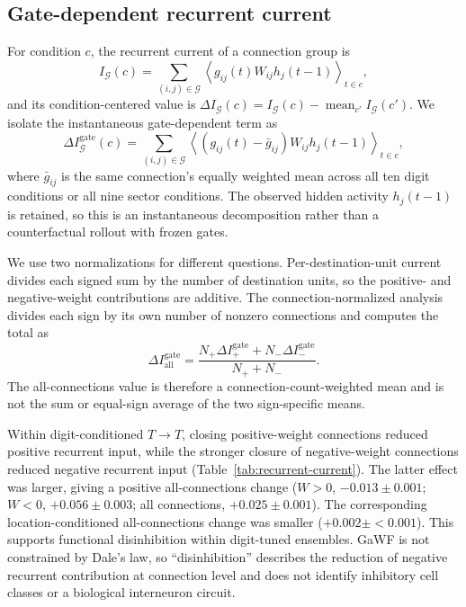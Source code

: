 \subsection{Gate-dependent recurrent current}

For condition \(c\), the recurrent current of a connection group is
\[
I_{\mathcal G}(c)=\sum_{(i,j)\in\mathcal G}\left\langle g_{ij}(t)W_{ij}h_j(t-1)\right\rangle_{t\in c},
\]
and its condition-centered value is \(\Delta I_{\mathcal G}(c)=I_{\mathcal G}(c)-\operatorname{mean}_{c'}I_{\mathcal G}(c')\). We isolate the instantaneous gate-dependent term as
\[
\Delta I^{\mathrm{gate}}_{\mathcal G}(c)=\sum_{(i,j)\in\mathcal G}\left\langle\left(g_{ij}(t)-\bar g_{ij}\right)W_{ij}h_j(t-1)\right\rangle_{t\in c},
\]
where \(\bar g_{ij}\) is the same connection's equally weighted mean across all ten digit conditions or all nine sector conditions. The observed hidden activity \(h_j(t-1)\) is retained, so this is an instantaneous decomposition rather than a counterfactual rollout with frozen gates.

We use two normalizations for different questions. Per-destination-unit current divides each signed sum by the number of destination units, so the positive- and negative-weight contributions are additive. The connection-normalized analysis divides each sign by its own number of nonzero connections and computes the total as
\[
\Delta I^{\mathrm{gate}}_{\mathrm{all}}=
\frac{N_+\Delta I^{\mathrm{gate}}_+ + N_-\Delta I^{\mathrm{gate}}_-}{N_++N_-}.
\]
The all-connections value is therefore a connection-count-weighted mean and is not the sum or equal-sign average of the two sign-specific means.

Within digit-conditioned \(T\!\to\!T\), closing positive-weight connections reduced positive recurrent input, while the stronger closure of negative-weight connections reduced negative recurrent input (Table~\ref{tab:recurrent-current}). The latter effect was larger, giving a positive all-connections change (\(W>0\), \(-0.013\pm0.001\); \(W<0\), \(+0.056\pm0.003\); all connections, \(+0.025\pm0.001\)). The corresponding location-conditioned all-connections change was smaller (\(+0.002\pm{<}0.001\)). This supports functional disinhibition within digit-tuned ensembles. GaWF is not constrained by Dale's law, so ``disinhibition'' describes the reduction of negative recurrent contribution at connection level and does not identify inhibitory cell classes or a biological interneuron circuit.

